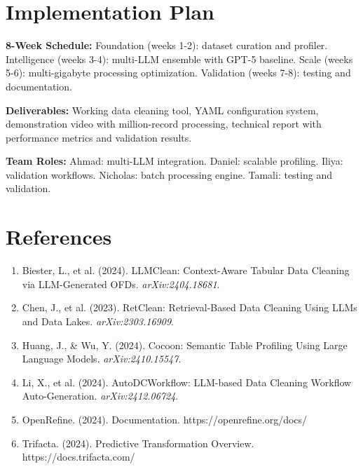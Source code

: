 \documentclass[11pt]{article}
\begin{document}
\section{\color{primaryblue}Implementation Plan}

\textbf{8-Week Schedule:} Foundation (weeks 1-2): dataset curation and profiler. Intelligence (weeks 3-4): multi-LLM ensemble with GPT-5 baseline. Scale (weeks 5-6): multi-gigabyte processing optimization. Validation (weeks 7-8): testing and documentation.

\textbf{Deliverables:} Working data cleaning tool, YAML configuration system, demonstration video with million-record processing, technical report with performance metrics and validation results.

\textbf{Team Roles:} Ahmad: multi-LLM integration. Daniel: scalable profiling. Iliya: validation workflows. Nicholas: batch processing engine. Tamali: testing and validation.

\section{\color{primaryblue}References}

\begin{enumerate}[itemsep=1pt]
\item Biester, L., et al. (2024). LLMClean: Context-Aware Tabular Data Cleaning via LLM-Generated OFDs. \textit{arXiv:2404.18681}.
\item Chen, J., et al. (2023). RetClean: Retrieval-Based Data Cleaning Using LLMs and Data Lakes. \textit{arXiv:2303.16909}.
\item Huang, J., \& Wu, Y. (2024). Cocoon: Semantic Table Profiling Using Large Language Models. \textit{arXiv:2410.15547}.
\item Li, X., et al. (2024). AutoDCWorkflow: LLM-based Data Cleaning Workflow Auto-Generation. \textit{arXiv:2412.06724}.
\item OpenRefine. (2024). Documentation. https://openrefine.org/docs/
\item Trifacta. (2024). Predictive Transformation Overview. https://docs.trifacta.com/
\end{enumerate}
\end{document}
